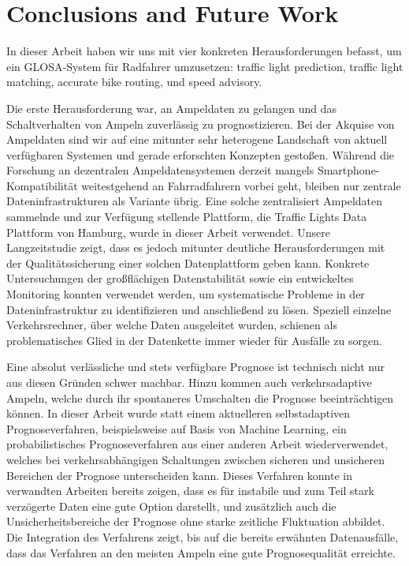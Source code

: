 \chapter{Conclusions and Future Work}\label{ch:conclusions}

In dieser Arbeit haben wir uns mit vier konkreten Herausforderungen befasst, um ein GLOSA-System für Radfahrer umzusetzen: traffic light prediction, traffic light matching, accurate bike routing, und speed advisory.

Die erste Herausforderung war, an Ampeldaten zu gelangen und das Schaltverhalten von Ampeln zuverlässig zu prognostizieren. Bei der Akquise von Ampeldaten sind wir auf eine mitunter sehr heterogene Landschaft von aktuell verfügbaren Systemen und gerade erforschten Konzepten gestoßen. Während die Forschung an dezentralen Ampeldatensystemen derzeit mangels Smartphone-Kompatibilität weitestgehend an Fahrradfahrern vorbei geht, bleiben nur zentrale Dateninfrastrukturen als Variante übrig. Eine solche zentralisiert Ampeldaten sammelnde und zur Verfügung stellende Plattform, die Traffic Lights Data Plattform von Hamburg, wurde in dieser Arbeit verwendet. Unsere Langzeitstudie zeigt, dass es jedoch mitunter deutliche Herausforderungen mit der Qualitätssicherung einer solchen Datenplattform geben kann. Konkrete Untersuchungen der großflächigen Datenstabilität sowie ein entwickeltes Monitoring konnten verwendet werden, um systematische Probleme in der Dateninfrastruktur zu identifizieren und anschließend zu lösen. Speziell einzelne Verkehrsrechner, über welche Daten ausgeleitet wurden, schienen als problematisches Glied in der Datenkette immer wieder für Ausfälle zu sorgen.

Eine absolut verlässliche und stets verfügbare Prognose ist technisch nicht nur aus diesen Gründen schwer machbar. Hinzu kommen auch verkehrsadaptive Ampeln, welche durch ihr spontaneres Umschalten die Prognose beeinträchtigen können. In dieser Arbeit wurde statt einem aktuelleren selbstadaptiven Prognoseverfahren, beispielsweise auf Basis von Machine Learning, ein probabilistisches Prognoseverfahren aus einer anderen Arbeit wiederverwendet, welches bei verkehrsabhängigen Schaltungen zwischen sicheren und unsicheren Bereichen der Prognose unterscheiden kann. Dieses Verfahren konnte in verwandten Arbeiten bereits zeigen, dass es für instabile und zum Teil stark verzögerte Daten eine gute Option darstellt, und zusätzlich auch die Unsicherheitsbereiche der Prognose ohne starke zeitliche Fluktuation abbildet. Die Integration des Verfahrens zeigt, bis auf die bereits erwähnten Datenausfälle, dass das Verfahren an den meisten Ampeln eine gute Prognosequalität erreichte. 


